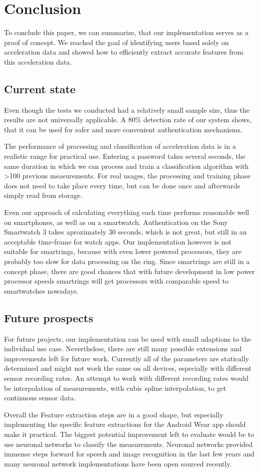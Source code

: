 \chapter{Conclusion}\label{chapter:conclusion}
To conclude this paper, we can summarize, that our implementation serves as a proof of concept. We reached the goal of identifying users based solely on acceleration data and showed how to efficiently extract accurate features from this acceleration data.

\section{Current state}
Even though the tests we conducted had a relatively small sample size, thus the results are not universally applicable. A 80\% detection rate of our system shows, that it can be used for safer and more convenient authentication mechanisms.

The performance of processing and classification of acceleration data is in a realistic range for practical use. Entering a password takes several seconds, \ie the same duration in which we can process and train a classification algorithm with >100 previous measurements. For real usages, the processing and training phase does not need to take place every time, but can be done once and afterwards simply read from storage.

Even our approach of calculating everything each time performs reasonable well on smartphones, as well as on a smartwatch. Authentication on the Sony Smartwatch 3 takes aproximately 30 seconds, which is not great, but still in an acceptable time-frame for watch \glspl{app}. Our implementation however is not suitable for smartrings, because with even lower powered processors, they are probably too slow for data processing on the ring. Since smartrings are still in a concept phase, there are good chances that with future development in low power processor speeds smartrings will get processors with comparable speed to smartwatches nowadays.

\section{Future prospects}
For future projects, our implementation can be used with small adaptions to the individual use case. Nevertheless, there are still many possible extensions and improvements left for future work. Currently all of the parameters are statically determined and might not work the same on all devices, especially with different sensor recording rates. An attempt to work with different recording rates would be interpolation of measurements, \eg with cubic spline interpolation, to get continuous sensor data.

Overall the Feature extraction steps are in a good shape, but especially implementing the specific feature extractions for the Android Wear \gls{app} should make it practical. The biggest potential improvement left to evaluate would be to use neuronal networks to classify the measurements. Neuronal networks provided immense steps forward for speech and image recognition in the last few years and many neuronal network implementations have been open sourced recently.
